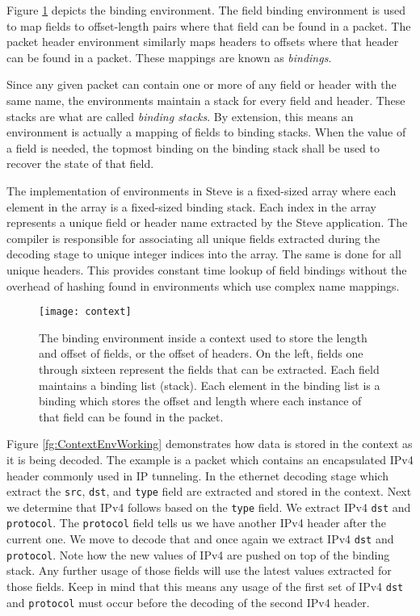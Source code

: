 Figure \ref{fg:ContextEnv} depicts the binding environment. The field binding environment is used to map fields to offset-length pairs where that field can be found in a packet. The packet header environment similarly maps headers to offsets where that header can be found in a packet. These mappings are known as \textit{bindings}.

Since any given packet can contain one or more of any field or header with the same name, the environments maintain a stack for every field and header. These stacks are what are called \textit{binding stacks}. By extension, this means an environment is actually a mapping of fields to binding stacks. When the value of a field is needed, the topmost binding on the binding stack shall be used to recover the state of that field.

The implementation of environments in Steve is a fixed-sized array where each element in the array is a fixed-sized binding stack. Each index in the array represents a unique field or header name extracted by the Steve application. The compiler is responsible for associating all unique fields extracted during the decoding stage to unique integer indices into the array. The same is done for all unique headers. This provides constant time lookup of field bindings without the overhead of hashing found in environments which use complex name mappings.

\begin{figure}
\texttt{[image: context]}
\caption{The binding environment inside a context used to store the length and offset of fields, or the offset of headers. On the left, fields one through sixteen represent the fields that can be extracted. Each field maintains a binding list (stack). Each element in the binding list is a binding which stores the offset and length where each instance of that field can be found in the packet. }
\label{fg:ContextEnv}
\end{figure}

Figure \ref{fg:ContextEnvWorking} demonstrates how data is stored in the context as it is being decoded. The example is a packet which contains an encapsulated IPv4 header commonly used in IP tunneling. In the ethernet decoding stage which extract the \texttt{src}, \texttt{dst}, and \texttt{type} field are extracted and stored in the context. Next we determine that IPv4 follows based on the \texttt{type} field. We extract IPv4 \texttt{dst} and \texttt{protocol}. The \texttt{protocol} field tells us we have another IPv4 header after the current one. We move to decode that and once again we extract IPv4 \texttt{dst} and \texttt{protocol}. Note how the new values of IPv4 are pushed on top of the binding stack. Any further usage of those fields will use the latest values extracted for those fields. Keep in mind that this means any usage of the first set of IPv4 \texttt{dst} and \texttt{protocol} must occur before the decoding of the second IPv4 header.\

